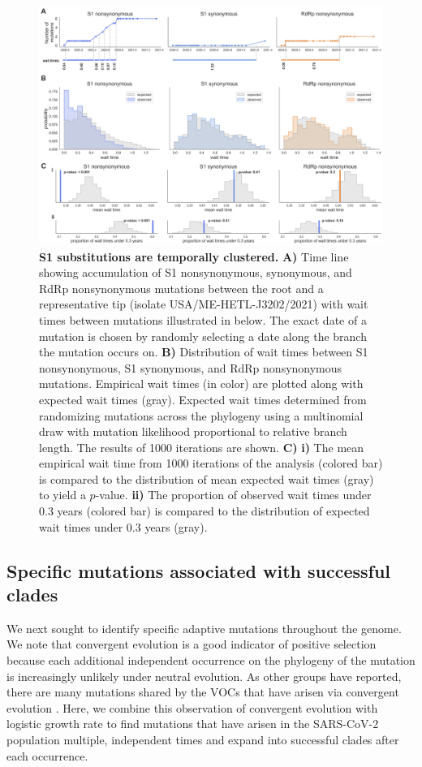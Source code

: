 \documentclass[11pt,oneside,letterpaper]{article}
\begin{document}
\begin{figure}[h!]
	\centerline{\includegraphics[scale=0.5]{fig3.png}}
	\caption{\textbf{S1 substitutions are temporally clustered.}
	\textbf{A)} Time line showing accumulation of S1 nonsynonymous, synonymous, and RdRp nonsynonymous mutations between the root and a representative tip (isolate USA/ME-HETL-J3202/2021) with wait times between mutations illustrated in below. The exact date of a mutation is chosen by randomly selecting a date along the branch the mutation occurs on. \textbf{B)} Distribution of wait times between S1 nonsynonymous, S1 synonymous, and RdRp nonsynonymous mutations. Empirical wait times (in color) are plotted along with expected wait times (gray). Expected wait times determined from randomizing mutations across the phylogeny using a multinomial draw with mutation likelihood proportional to relative branch length. The results of 1000 iterations are shown. \textbf{C)} \textbf{i)} The mean empirical wait time from 1000 iterations of the analysis (colored bar) is compared to the distribution of mean expected wait times (gray) to yield a $p$-value. \textbf{ii)} The proportion of observed wait times under 0.3 years (colored bar) is compared to the distribution of expected wait times under 0.3 years (gray).
	}
	\label{fig:fig3}
\end{figure}

\subsection*{Specific mutations associated with successful clades}
We next sought to identify specific adaptive mutations throughout the genome. We note that convergent evolution is a good indicator of positive selection because each additional independent occurrence on the phylogeny of the mutation is increasingly unlikely under neutral evolution. As other groups have reported, there are many mutations shared by the VOCs that have arisen via convergent evolution \cite{Van_Dorp2020-ox, Rochman2021-sv, Martin2021-lj}. Here, we combine this observation of convergent evolution with logistic growth rate to find mutations that have arisen in the SARS-CoV-2 population multiple, independent times and expand into successful clades after each occurrence.
\end{document}
